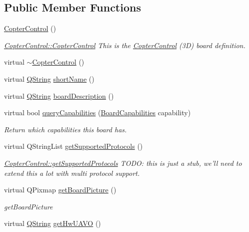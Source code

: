 \subsection*{Public Member Functions}
\begin{DoxyCompactItemize}
\item 
\hyperlink{group___boards___open_pilot_plugin_gadbec7022641a51cd87f98ca7dc734dcf}{Copter\-Control} ()
\begin{DoxyCompactList}\small\item\em \hyperlink{group___boards___open_pilot_plugin_gadbec7022641a51cd87f98ca7dc734dcf}{Copter\-Control\-::\-Copter\-Control} This is the \hyperlink{class_copter_control}{Copter\-Control} (3\-D) board definition. \end{DoxyCompactList}\item 
virtual \hyperlink{group___boards___open_pilot_plugin_ga42d298de6b0fb7cc74d9206f1cf18d40}{$\sim$\-Copter\-Control} ()
\item 
virtual \hyperlink{group___u_a_v_objects_plugin_gab9d252f49c333c94a72f97ce3105a32d}{Q\-String} \hyperlink{group___boards___open_pilot_plugin_ga0d1055d64f286350d10a89536e595046}{short\-Name} ()
\item 
virtual \hyperlink{group___u_a_v_objects_plugin_gab9d252f49c333c94a72f97ce3105a32d}{Q\-String} \hyperlink{group___boards___open_pilot_plugin_ga68dacf81a6b453c748b0403fa459a1e4}{board\-Description} ()
\item 
virtual bool \hyperlink{group___boards___open_pilot_plugin_ga5717283400c4b93b0c580a2af504a5d2}{query\-Capabilities} (\hyperlink{group___core_plugin_ga01b09218f2a13aaeee6db007ac6bd967}{Board\-Capabilities} capability)
\begin{DoxyCompactList}\small\item\em Return which capabilities this board has. \end{DoxyCompactList}\item 
virtual Q\-String\-List \hyperlink{group___boards___open_pilot_plugin_ga5cf6a3278133728b41ab54897e6e8ef0}{get\-Supported\-Protocols} ()
\begin{DoxyCompactList}\small\item\em \hyperlink{group___boards___open_pilot_plugin_ga5cf6a3278133728b41ab54897e6e8ef0}{Copter\-Control\-::get\-Supported\-Protocols} T\-O\-D\-O\-: this is just a stub, we'll need to extend this a lot with multi protocol support. \end{DoxyCompactList}\item 
virtual Q\-Pixmap \hyperlink{group___boards___open_pilot_plugin_ga06b9d173fe63133904394ae9f15d48ba}{get\-Board\-Picture} ()
\begin{DoxyCompactList}\small\item\em get\-Board\-Picture \end{DoxyCompactList}\item 
virtual \hyperlink{group___u_a_v_objects_plugin_gab9d252f49c333c94a72f97ce3105a32d}{Q\-String} \hyperlink{group___boards___open_pilot_plugin_ga844238f46b4df3aaf945874c9a6797ca}{get\-Hw\-U\-A\-V\-O} ()
\end{DoxyCompactItemize}
